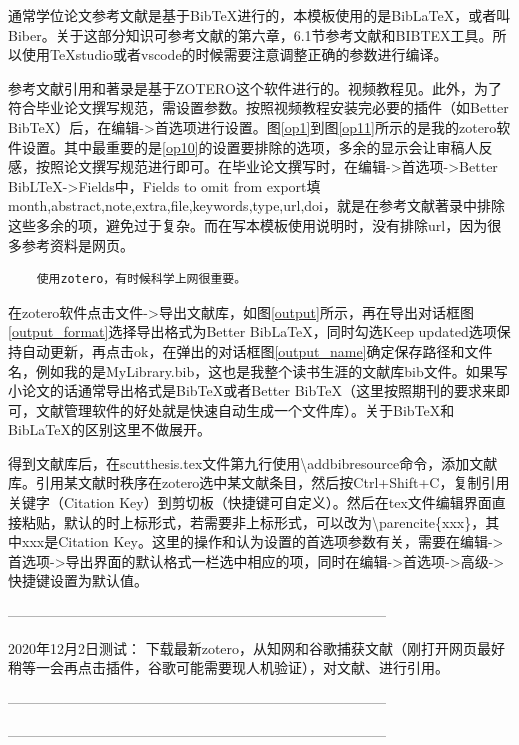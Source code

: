 通常学位论文参考文献是基于BibTeX进行的，本模板使用的是BibLaTeX，或者叫Biber。关于这部分知识可参考文献\parencite{_c,_g}的第六章，6.1节参考文献和BIBTEX工具。所以使用TeXstudio或者vscode的时候需要注意调整正确的参数进行编译。

参考文献引用和著录是基于ZOTERO这个软件进行的。视频教程见\parencite{_k}。此外，为了符合毕业论文撰写规范，需设置参数。按照视频教程安装完必要的插件（如Better BibTeX）后，在编辑->首选项进行设置。图\ref{op1}到图\ref{op11}所示的是我的zotero软件设置。其中最重要的是\ref{op10}的设置要排除的选项，多余的显示会让审稿人反感，按照论文撰写规范进行即可。在毕业论文撰写时，在编辑->首选项->Better BibLTeX->Fields中，Fields to omit from export填month,abstract,note,extra,file,keywords,type,url,doi，就是在参考文献著录中排除这些多余的项，避免过于复杂。而在写本模板使用说明时，没有排除url，因为很多参考资料是网页。

\begin{lstlisting}
    使用zotero，有时候科学上网很重要。
\end{lstlisting}

在zotero软件点击文件->导出文献库，如图\ref{output}所示，再在导出对话框图\ref{output_format}选择导出格式为Better BibLaTeX，同时勾选Keep updated选项保持自动更新，再点击ok，在弹出的对话框图\ref{output_name}确定保存路径和文件名，例如我的是MyLibrary.bib，这也是我整个读书生涯的文献库bib文件。如果写小论文的话通常导出格式是BibTeX或者Better BibTeX（这里按照期刊的要求来即可，文献管理软件的好处就是快速自动生成一个文件库）。关于BibTeX和BibLaTeX的区别这里不做展开。

得到文献库后，在scutthesis.tex文件第九行使用\textbackslash{}addbibresource命令，添加文献库。引用某文献时秩序在zotero选中某文献条目，然后按Ctrl+Shift+C，复制引用关键字（Citation Key）到剪切板（快捷键可自定义）。然后在tex文件编辑界面直接粘贴，默认的时上标形式，若需要非上标形式，可以改为\textbackslash{}parencite\{xxx\}，其中xxx是Citation Key。这里的操作和认为设置的首选项参数有关，需要在编辑->首选项->导出界面的默认格式一栏选中相应的项，同时在编辑->首选项->高级->快捷键设置为默认值。

---------------------------------------------------------------------------------

2020年12月2日测试：
下载最新zotero，从知网和谷歌捕获文献（刚打开网页最好稍等一会再点击插件，谷歌可能需要现人机验证），对文献\parencite{Renduchintala_2019}、\parencite{milz2020design}进行引用。

---------------------------------------------------------------------------------

---------------------------------------------------------------------------------

